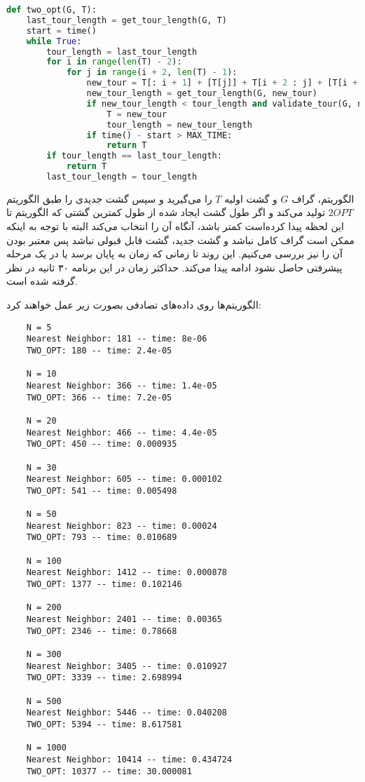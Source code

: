 \documentclass[]{article}
\begin{document}
\begin{latin}
\begin{lstlisting}[language=python]
def two_opt(G, T):
    last_tour_length = get_tour_length(G, T)
    start = time()
    while True:
        tour_length = last_tour_length
        for i in range(len(T) - 2):
            for j in range(i + 2, len(T) - 1):
                new_tour = T[: i + 1] + [T[j]] + T[i + 2 : j] + [T[i + 1]] + T[j + 1 :]
                new_tour_length = get_tour_length(G, new_tour)
                if new_tour_length < tour_length and validate_tour(G, new_tour):
                    T = new_tour
                    tour_length = new_tour_length
                if time() - start > MAX_TIME:
                    return T
        if tour_length == last_tour_length:
            return T
        last_tour_length = tour_length
\end{lstlisting}
\end{latin}
الگوریتم، گراف $G$ و گشت اولیه $T$ را می‌گیرید و
سپس گشت جدیدی را طبق الگوریتم $2OPT$ تولید می‌کند و
اگر طول گشت ایجاد شده از طول کمترین گشتی که الگوریتم تا این لحظه پیدا کرده‌است
کمتر باشد، آنگاه آن را انتخاب می‌کند البته با توجه به اینکه
ممکن است گراف کامل نباشد و گشت جدید، گشت قابل قبولی نباشد پس معتبر بودن آن را نیز بررسی می‌کنیم.
این روند تا زمانی که زمان به پایان برسد یا
در یک مرحله پیشرفتی حاصل نشود ادامه پیدا می‌کند.
حداکثر زمان در این برنامه ۳۰ ثانیه در نظر گرفته شده است.

\vspace{0.2cm}
الگوریتم‌ها روی داده‌های تصادفی بصورت زیر عمل خواهند کرد:

\begin{latin}
\begin{lstlisting}
    N = 5
    Nearest Neighbor: 181 -- time: 8e-06
    TWO_OPT: 180 -- time: 2.4e-05
    
    N = 10
    Nearest Neighbor: 366 -- time: 1.4e-05
    TWO_OPT: 366 -- time: 7.2e-05
    
    N = 20
    Nearest Neighbor: 466 -- time: 4.4e-05
    TWO_OPT: 450 -- time: 0.000935
    
    N = 30
    Nearest Neighbor: 605 -- time: 0.000102
    TWO_OPT: 541 -- time: 0.005498
    
    N = 50
    Nearest Neighbor: 823 -- time: 0.00024
    TWO_OPT: 793 -- time: 0.010689
    
    N = 100
    Nearest Neighbor: 1412 -- time: 0.000878
    TWO_OPT: 1377 -- time: 0.102146
    
    N = 200
    Nearest Neighbor: 2401 -- time: 0.00365
    TWO_OPT: 2346 -- time: 0.78668
    
    N = 300
    Nearest Neighbor: 3405 -- time: 0.010927
    TWO_OPT: 3339 -- time: 2.698994
    
    N = 500
    Nearest Neighbor: 5446 -- time: 0.040208
    TWO_OPT: 5394 -- time: 8.617581
    
    N = 1000
    Nearest Neighbor: 10414 -- time: 0.434724
    TWO_OPT: 10377 -- time: 30.000081    
\end{lstlisting}
\end{latin}
\end{document}
